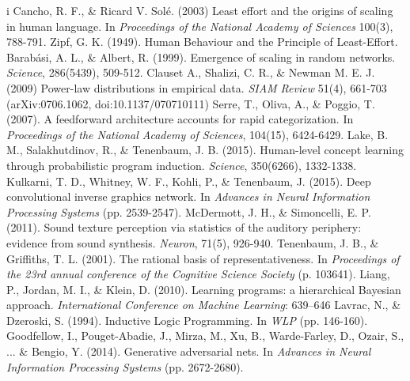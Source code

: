 \documentclass[11pt,letterpaper]{article}
\begin{document}
\begin{thebibliography}{}
   i Cancho, R. F., \& Ricard V. Solé. (2003)
    Least effort and the origins of scaling in human language.
    In \emph{Proceedings of the National Academy of Sciences} 100(3), 788-791.
   Zipf, G. K. (1949).
    Human Behaviour and the Principle of Least-Effort.
    Barab\'asi, A. L., \& Albert, R. (1999).
    Emergence of scaling in random networks.
    \emph{Science}, 286(5439), 509-512.
   Clauset A., Shalizi, C. R., \& Newman M. E. J.  (2009)
    Power-law distributions in empirical data.
    \emph{SIAM Review} 51(4), 661-703 (arXiv:0706.1062, doi:10.1137/070710111)
    Serre, T., Oliva, A., \& Poggio, T. (2007).
    A feedforward architecture accounts for rapid categorization.
    In \emph{Proceedings of the National Academy of Sciences}, 104(15), 6424-6429.
   Lake, B. M., Salakhutdinov, R., \& Tenenbaum, J. B. (2015).
    Human-level concept learning through probabilistic program induction.
    \emph{Science}, 350(6266), 1332-1338.
    Kulkarni, T. D., Whitney, W. F., Kohli, P., \& Tenenbaum, J. (2015).
      Deep convolutional inverse graphics network.
      In \emph{Advances in Neural Information Processing Systems} (pp. 2539-2547).
    McDermott, J. H., \& Simoncelli, E. P. (2011).
      Sound texture perception via statistics of the auditory periphery: evidence from sound synthesis.
      \emph{Neuron}, 71(5), 926-940.
    Tenenbaum, J. B., \& Griffiths, T. L. (2001).
      The rational basis of representativeness.
      In \emph{Proceedings of the 23rd annual conference of the Cognitive
      Science Society} (p. 103641).
    Liang, P., Jordan, M. I., \& Klein, D. (2010).
    Learning programs: a hierarchical Bayesian approach.
    \emph{International Conference on Machine Learning}: 639–646
    Lavrac, N., \& Dzeroski, S. (1994).
      Inductive Logic Programming.
      In \emph{WLP} (pp. 146-160).
    Goodfellow, I., Pouget-Abadie, J., Mirza, M., Xu, B., Warde-Farley, D.,
      Ozair, S., ... \& Bengio, Y. (2014).
      Generative adversarial nets.
      In \emph{Advances in Neural Information Processing Systems} (pp. 2672-2680).
\end{thebibliography}
\end{document}
